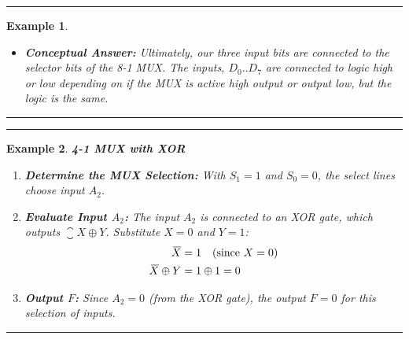 \documentclass[12pt]{article}
\newtheorem{example}{Example}
\newenvironment{examp}
{\vspace{0.5cm}
 \hrule
\vspace{0.5cm}
\begin{example}}
{\hrule
\vspace{0.5cm}
\end{example}}
\begin{document}
\begin{examp}
\begin{itemize}
		      \begin{itemize}
			      \item \( D_0 = 1 \) (since \( m(0) = 000 \))
			      \item \( D_1 = 1 \) (since \( m(1) = 001 \))
			      \item \( D_6 = 1 \) (since \( m(6) = 110 \))
			      \item \( D_7 = 1 \) (since \( m(7) = 111 \))
			      \item All other inputs (\( D_2, D_3, D_4, D_5 \)) are set to 0.
		      \end{itemize}
		\item \textbf{Conceptual Answer:} Ultimately, our three input bits are connected to the selector
		      bits of the 8-1 MUX. The inputs, \(D_0..D_7\) are connected to logic high
		      or low depending on if the MUX is active high output or output low,
		      but the logic is the same.

	\end{itemize}
\end{examp}

\begin{examp}
	\textbf{4-1 MUX with XOR}

	\begin{enumerate}
		\item \textbf{Determine the MUX Selection:} With \( S_1 = 1 \) and \( S_0 = 0 \), the select lines choose input \( A_2 \).

		\item \textbf{Evaluate Input \( A_2 \):} The input \( A_2 \) is connected to an XOR gate, which outputs \( \closure{X} \oplus Y \). Substitute \( X = 0 \) and \( Y = 1 \):
		      \begin{align*}
			      {}\mkern3mu\overline{\mkern-3muX}          & = 1 \quad \text{(since \( X = 0 \))} \\
			      {}\mkern3mu\overline{\mkern-3muX} \oplus Y & = 1 \oplus 1 = 0
		      \end{align*}

		\item \textbf{Output \( F \):} Since \( A_2 = 0 \) (from the XOR gate), the output \( F = 0 \) for this selection of inputs.
	\end{enumerate}
\end{examp}
\end{document}

